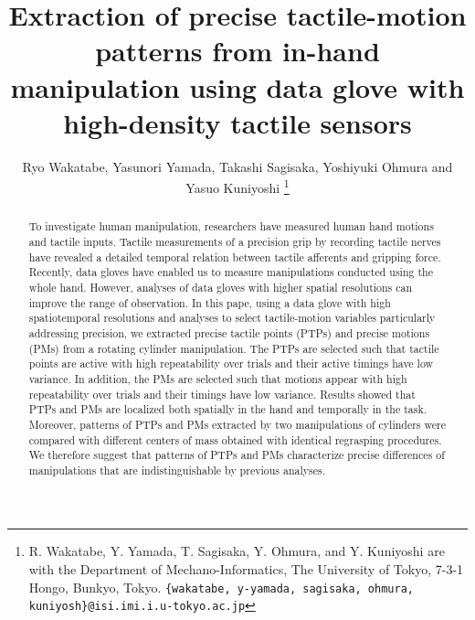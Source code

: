 \documentclass[letterpaper, 10 pt, conference]{IEEEtran}  %
\title{\LARGE \bf
Extraction of precise tactile-motion patterns from in-hand manipulation
using data glove with high-density tactile sensors
}
\author{Ryo Wakatabe, Yasunori Yamada, Takashi Sagisaka, Yoshiyuki Ohmura and Yasuo Kuniyoshi%
    \thanks{R. Wakatabe, Y. Yamada, T. Sagisaka, Y. Ohmura, and Y. Kuniyoshi are with the Department of Mechano-Informatics, The University of Tokyo, 7-3-1 Hongo, Bunkyo, Tokyo.  {\tt\small \{wakatabe, y-yamada, sagisaka, ohmura, kuniyosh\}@isi.imi.i.u-tokyo.ac.jp}}%

}
\begin{document}
\maketitle
\thispagestyle{empty}
\pagestyle{empty}

\begin{abstract}
To investigate human manipulation, researchers have measured human hand motions and tactile inputs.
Tactile measurements of a precision grip by recording tactile nerves have revealed a detailed temporal relation between tactile afferents and gripping force. Recently, data gloves have enabled us to measure manipulations conducted using the whole hand. However, analyses of data gloves with higher spatial resolutions can improve the range of observation.
In this pape, using a data glove with high spatiotemporal resolutions and analyses to select tactile-motion variables particularly addressing precision, we extracted precise tactile points (PTPs) and precise motions (PMs) from a rotating cylinder manipulation. The PTPs are selected such that tactile points are active with high repeatability over trials and their active timings have low variance. In addition, the PMs are selected such that motions appear with high repeatability over trials and their timings have low variance. Results showed that PTPs and PMs are localized both spatially in the hand and temporally in the task. Moreover, patterns of PTPs and PMs extracted by two manipulations of cylinders were compared with different centers of mass obtained with identical regrasping procedures. We therefore suggest that patterns of PTPs and PMs characterize precise differences of manipulations that are indistinguishable by previous analyses.



\end{abstract}
\end{document}
